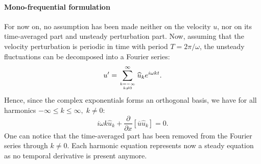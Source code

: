 \paragraph{Mono-frequential formulation}
For now on, no assumption has been made neither on the velocity $u$,
nor on its time-averaged part and unsteady perturbation part.
Now, assuming that the velocity perturbation 
is periodic in time with period
$T=2 \pi / \omega$,
the unsteady fluctuations can be decomposed into 
a Fourier series:
\begin{equation}
	u^\prime = \sum_{k=-\infty \atop k \neq 0}^{\infty} 
	\widehat{u}_k e^{i \omega k t}.
	\label{eq:sm_nlh_decomposition_pert}
\end{equation}
Hence, since the complex exponentials forms 
an orthogonal basis, we have for all harmonics 
$-\infty \leq k \leq \infty, \; k \neq 0$:
\begin{equation}
	i \omega k \widehat{u}_k + 
	\frac{\partial}{\partial x} \left[ \overline{u} \widehat{u}_k\right] =
	0.
\end{equation}
One can notice that the time-averaged part has been removed from
the Fourier series through $k \neq 0$.
Each harmonic equation represents now a steady equation as no temporal
derivative is present anymore.

